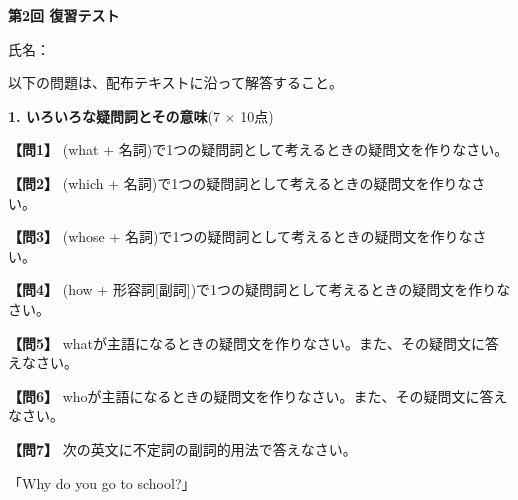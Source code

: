 
\begin{center}
{\Large\textbf{第2回 復習テスト}}
\end{center}

\vspace{0.2em}
\begin{flushright}
氏名：\underline{\hspace{14em}}
\end{flushright}

\vspace{0.3em}
\noindent 以下の問題は、配布テキストに沿って解答すること。

\vspace{0.4em}
\noindent\textbf{1. いろいろな疑問詞とその意味}(7 $\times$ 10点)

\noindent\textbf{【問1】} (what + 名詞)で1つの疑問詞として考えるときの疑問文を作りなさい。

\testqsep

\noindent\textbf{【問2】} (which + 名詞)で1つの疑問詞として考えるときの疑問文を作りなさい。

\testqsep

\noindent\textbf{【問3】}  (whose + 名詞)で1つの疑問詞として考えるときの疑問文を作りなさい。

\testqsep

\noindent\textbf{【問4】}  (how + 形容詞[副詞])で1つの疑問詞として考えるときの疑問文を作りなさい。

\testqsep

\noindent\textbf{【問5】} whatが主語になるときの疑問文を作りなさい。また、その疑問文に答えなさい。

\testqsep

\noindent\textbf{【問6】} whoが主語になるときの疑問文を作りなさい。また、その疑問文に答えなさい。

\testsectsep

\noindent\textbf{【問7】} 次の英文に不定詞の副詞的用法で答えなさい。

「Why do you go to school?」

\testqsep

